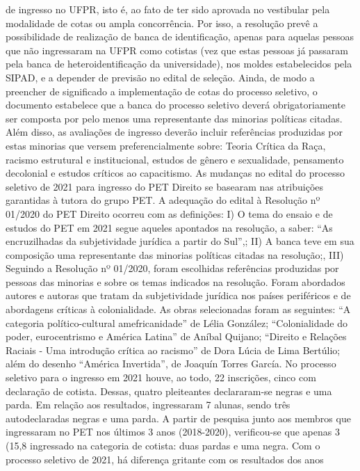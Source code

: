 de ingresso no UFPR, isto é, ao fato de ter sido aprovada no vestibular pela modalidade de cotas
ou ampla concorrência. Por isso, a resolução prevê a possibilidade de realização de banca de
identificação, apenas para aquelas pessoas que não ingressaram na UFPR como cotistas (vez que
estas pessoas já passaram pela banca de heteroidentificação da universidade), nos moldes
estabelecidos pela SIPAD, e a depender de previsão no edital de seleção.
Ainda, de modo a preencher de significado a implementação de cotas do processo
seletivo, o documento estabelece que a banca do processo seletivo deverá obrigatoriamente ser
composta por pelo menos uma representante das minorias políticas citadas. Além disso, as
avaliações de ingresso deverão incluir referências produzidas por estas minorias que versem
preferencialmente sobre: Teoria Crítica da Raça, racismo estrutural e institucional, estudos de
gênero e sexualidade, pensamento decolonial e estudos críticos ao capacitismo.
As mudanças no edital do processo seletivo de 2021 para ingresso do PET Direito se
basearam nas atribuições garantidas à tutora do grupo PET. A adequação do edital à Resolução
nº 01/2020 do PET Direito ocorreu com as definições: I) O tema do ensaio e de estudos do PET
em 2021 segue aqueles apontados na resolução, a saber: “As encruzilhadas da subjetividade
jurídica a partir do Sul”,; II) A banca teve em sua composição uma representante das minorias
políticas citadas na resolução;, III) Seguindo a Resolução nº 01/2020, foram escolhidas
referências produzidas por pessoas das minorias e sobre os temas indicados na resolução. Foram
abordados autores e autoras que tratam da subjetividade jurídica nos países periféricos e de
abordagens críticas à colonialidade. As obras selecionadas foram as seguintes: “A categoria
político-cultural amefricanidade” de Lélia González; “Colonialidade do poder, eurocentrismo e
América Latina” de Aníbal Quijano; “Direito e Relações Raciais - Uma introdução crítica ao
racismo” de Dora Lúcia de Lima Bertúlio; além do desenho “América Invertida”, de Joaquín
Torres García.
No processo seletivo para o ingresso em 2021 houve, ao todo, 22 inscrições, cinco com
declaração de cotista. Dessas, quatro pleiteantes declararam-se negras e uma parda. Em relação
aos resultados, ingressaram 7 alunas, sendo três autodeclaradas negras e uma parda. A partir de
pesquisa junto aos membros que ingressaram no PET nos últimos 3 anos (2018-2020),
verificou-se que apenas 3 (15,8%
ingressado na categoria de cotista: duas pardas e uma negra.
Com o processo seletivo de 2021, há diferença gritante com os resultados dos anos
